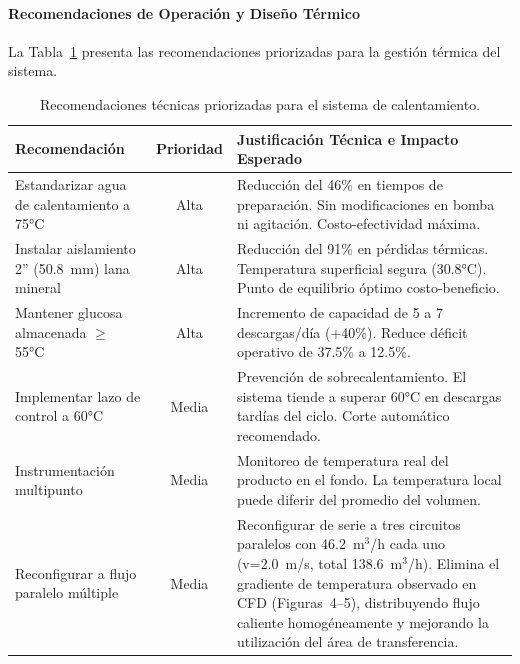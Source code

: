 \paragraph{Recomendaciones de Operación y Diseño Térmico}

La Tabla~\ref{tab:resumen_recomendaciones_termicas} presenta las recomendaciones priorizadas para la gestión térmica del sistema.

\begin{table}[H]
\centering
\caption{Recomendaciones técnicas priorizadas para el sistema de calentamiento.}
\label{tab:resumen_recomendaciones_termicas}
\setcounter{itemcount}{0}
\begin{tabularx}{\textwidth}{@{}lcX@{}}
\toprule
\textbf{Recomendación} & \textbf{Prioridad} & \textbf{Justificación Técnica e Impacto Esperado} \\
\midrule
Estandarizar agua de calentamiento a 75°C & Alta & Reducción del 46\% en tiempos de preparación. Sin modificaciones en bomba ni agitación. Costo-efectividad máxima. \\
\midrule
Instalar aislamiento 2'' (50.8~mm) lana mineral & Alta & Reducción del 91\% en pérdidas térmicas. Temperatura superficial segura (30.8°C). Punto de equilibrio óptimo costo-beneficio. \\
\midrule
Mantener glucosa almacenada $\geq$ 55°C & Alta & Incremento de capacidad de 5 a 7 descargas/día (+40\%). Reduce déficit operativo de 37.5\% a 12.5\%. \\
\midrule
Implementar lazo de control a 60°C & Media & Prevención de sobrecalentamiento. El sistema tiende a superar 60°C en descargas tardías del ciclo. Corte automático recomendado. \\
\midrule
Instrumentación multipunto & Media & Monitoreo de temperatura real del producto en el fondo. La temperatura local puede diferir del promedio del volumen. \\
\midrule
Reconfigurar a flujo paralelo múltiple & Media & Reconfigurar de serie a tres circuitos paralelos con 46.2~m$^3$/h cada uno (v=2.0~m/s, total 138.6~m$^3$/h). Elimina el gradiente de temperatura observado en CFD (Figuras~4--5), distribuyendo flujo caliente homogéneamente y mejorando la utilización del área de transferencia. \\
\bottomrule
\end{tabularx}
\end{table}


